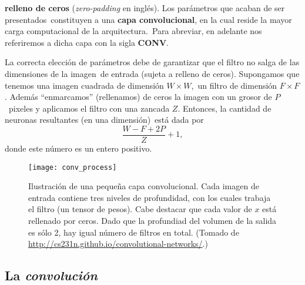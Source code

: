 \textbf{relleno de ceros} (\emph{zero-padding} en inglés). Los parámetros que acaban de ser presentados\
constituyen a una \textbf{capa convolucional}, en la cual reside la mayor carga computacional de la arquitectura.\
Para abreviar, en adelante nos referiremos a dicha capa con la sigla \textbf{CONV}.\par
La correcta elección de parámetros debe de garantizar que el filtro no salga de las dimensiones de la imagen\
de entrada (sujeta a relleno de ceros). Supongamos que tenemos una imagen cuadrada de dimensión $W \times W$,\
un filtro de dimensión $F \times F$. Además ``enmarcamos'' (rellenamos) de ceros la imagen con un grosor de $P$\
pixeles y aplicamos el filtro con una zancada $Z$. Entonces, la cantidad de neuronas resultantes (en una dimensión)\
está dada por
\begin{equation}
  \frac{W - F + 2P}{Z} + 1,
\end{equation}
donde este número es un entero positivo.

\begin{figure}
  \centering
  \texttt{[image: conv\_process]}
  \caption{Ilustración de una pequeña capa convolucional.
    Cada imagen de entrada contiene tres niveles de profundidad, con los cuales trabaja
    el filtro (un tensor de pesos). Cabe destacar que cada valor de $x$ está rellenado por ceros.
    Dado que la profundiad del volumen de la salida es sólo 2, hay igual número de filtros en total.
    (Tomado de \url{http://cs231n.github.io/convolutional-networks/}.)}
  \label{fCNN_fig}
\end{figure}

\subsection{La \emph{convolución}}

